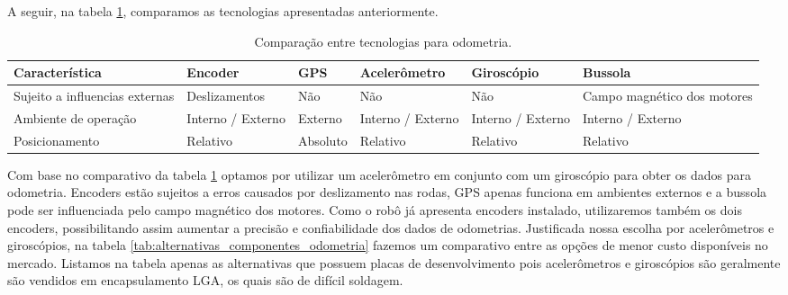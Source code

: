 A seguir, na tabela \ref{tab:alternativas_tecnologias_odometria}, comparamos as tecnologias apresentadas anteriormente. 

\begin{table}[h]
  \caption{Comparação entre tecnologias para odometria.}
  \centering
  \begin{tabular}{p{3cm}|p{2.2cm}p{1.7cm}p{2.2cm}p{2.2cm}p{2.2cm}}
    \toprule
    \textbf{Característica} & \textbf{Encoder} & \textbf{GPS} & \textbf{Acelerômetro} & \textbf{Giroscópio} & \textbf{Bussola} \\
    \hline
    Sujeito a influencias externas & Deslizamentos & Não & Não & Não & Campo magnético dos motores \\
    \hline
    Ambiente de operação & Interno / Externo & Externo & Interno / Externo & Interno / Externo & Interno / Externo \\
    \hline
    Posicionamento & Relativo & Absoluto & Relativo & Relativo & Relativo \\
    \bottomrule
  \end{tabular}
  \label{tab:alternativas_tecnologias_odometria}
\end{table}

Com base no comparativo da tabela \ref{tab:alternativas_tecnologias_odometria} optamos por utilizar um acelerômetro em conjunto com um giroscópio para obter os dados para odometria. Encoders estão sujeitos a erros causados por deslizamento nas rodas, GPS apenas funciona em ambientes externos e a bussola pode ser influenciada pelo campo magnético dos motores. Como o robô já apresenta encoders instalado, utilizaremos também os dois encoders, possibilitando assim aumentar a precisão e confiabilidade dos dados de odometrias.
Justificada nossa escolha por acelerômetros e giroscópios, na tabela \ref{tab:alternativas_componentes_odometria} fazemos um comparativo entre as opções de menor custo disponíveis no mercado. Listamos na tabela apenas as alternativas que possuem placas de desenvolvimento pois acelerômetros e giroscópios são geralmente são vendidos em encapsulamento LGA, os quais são de difícil soldagem.

